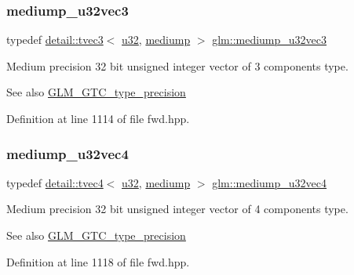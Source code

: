 \subsubsection{\texorpdfstring{mediump\+\_\+u32vec3}{mediump\_u32vec3}}
{\footnotesize\ttfamily typedef \hyperlink{structglm_1_1detail_1_1tvec3}{detail\+::tvec3}$<$ \hyperlink{group__gtc__type__precision_ga54e837745059fd29017bed71cfa0a8db}{u32}, \hyperlink{namespaceglm_a0f04f086094c747d227af4425893f545a6416f3ea0c9025fb21ed50c4d6620482}{mediump} $>$ \hyperlink{group__gtc__type__precision_ga84a903ce8834b22f78d80a64eb0181bb}{glm\+::mediump\+\_\+u32vec3}}

Medium precision 32 bit unsigned integer vector of 3 components type. \begin{DoxySeeAlso}{See also}
\hyperlink{group__gtc__type__precision}{G\+L\+M\+\_\+\+G\+T\+C\+\_\+type\+\_\+precision} 
\end{DoxySeeAlso}


Definition at line 1114 of file fwd.\+hpp.

\mbox{\label{group__gtc__type__precision_ga532f59ac4c36a7e1371341165f7be33b}} 
\subsubsection{\texorpdfstring{mediump\+\_\+u32vec4}{mediump\_u32vec4}}
{\footnotesize\ttfamily typedef \hyperlink{structglm_1_1detail_1_1tvec4}{detail\+::tvec4}$<$ \hyperlink{group__gtc__type__precision_ga54e837745059fd29017bed71cfa0a8db}{u32}, \hyperlink{namespaceglm_a0f04f086094c747d227af4425893f545a6416f3ea0c9025fb21ed50c4d6620482}{mediump} $>$ \hyperlink{group__gtc__type__precision_ga532f59ac4c36a7e1371341165f7be33b}{glm\+::mediump\+\_\+u32vec4}}

Medium precision 32 bit unsigned integer vector of 4 components type. \begin{DoxySeeAlso}{See also}
\hyperlink{group__gtc__type__precision}{G\+L\+M\+\_\+\+G\+T\+C\+\_\+type\+\_\+precision} 
\end{DoxySeeAlso}


Definition at line 1118 of file fwd.\+hpp.

\mbox{\label{group__gtc__type__precision_ga00c51a16fa190b0a90205d50d6d8a44a}} 
